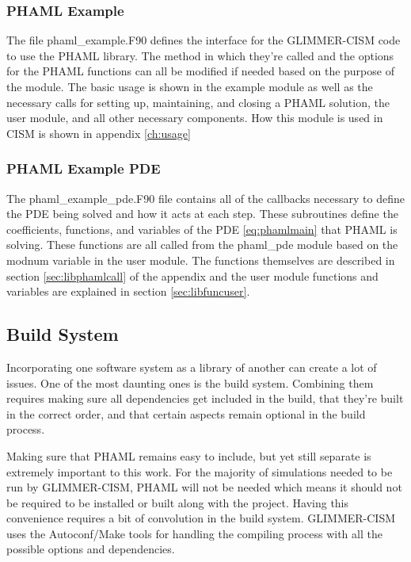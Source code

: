 \subsubsection{PHAML Example}

The file phaml\_example.F90 defines the interface for the GLIMMER-CISM code to use the PHAML library.  The method in which they're called and the options for the PHAML functions can all be modified if needed based on the purpose of the module.  The basic usage is shown in the example module as well as the necessary calls for setting up, maintaining, and closing a PHAML solution, the user module, and all other necessary components.  How this module is used in CISM is shown in appendix \ref{ch:usage}

\subsubsection{PHAML Example PDE}

The phaml\_example\_pde.F90 file contains all of the callbacks necessary to define the PDE being solved and how it acts at each step.  These subroutines define the coefficients, functions, and variables of the PDE \ref{eq:phamlmain} that PHAML is solving.  These functions are all called from the phaml\_pde module based on the modnum variable in the user module.  The functions themselves are described in section \ref{sec:libphamlcall} of the appendix and the user module functions and variables are explained in section \ref{sec:libfuncuser}. 

\subsection{Build System}\label{sec:ch4make}

Incorporating one software system as a library of another can create a lot of issues.  One of the most daunting ones is the build system.  Combining them requires making sure all dependencies get included in the build, that they're built in the correct order, and that certain aspects remain optional in the build process.

Making sure that PHAML remains easy to include, but yet still separate is extremely important to this work.  For the majority of simulations needed to be run by GLIMMER-CISM, PHAML will not be needed which means it should not be required to be installed or built along with the project.  Having this convenience requires a bit of convolution in the build system.  GLIMMER-CISM uses the Autoconf/Make tools for handling the compiling process with all the possible options and dependencies.  

